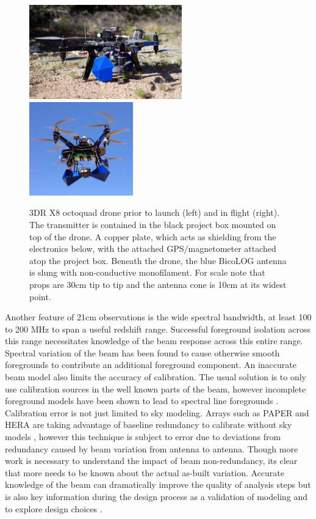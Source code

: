 \documentclass[preprint2,numberedappendix,tighten,twocolappendix]{aastex6}
\begin{document}
\begin{figure}[hbt]
\centering
\includegraphics[width=0.59\textwidth]{figures/drone2.png}
\includegraphics[width=0.4\textwidth]{figures/drone.png}
\caption{3DR X8 octoquad drone prior to launch (left) and in flight (right).  The transmitter is contained in the black project box mounted on top of the drone.  A copper plate, which acts as shielding from the electronics below, with the attached GPS/magnetometer attached atop the project box. Beneath the drone, the blue  BicoLOG antenna is slung with non-conductive monofilament. For scale note that props are 30cm tip to tip and the antenna cone is 10cm at its widest point.}
\label{fig:drone}
\end{figure}
Another feature of 21cm observations is the wide spectral bandwidth, at least 100 to 200 MHz to span a useful redshift range. Successful foreground isolation across this range necessitates knowledge of the beam response across this entire range.  Spectral variation of the beam has been found to cause otherwise smooth foregrounds to contribute an additional foreground component\citep{2016:ThyagarajanBeamChromaticity,2016:EwallWiceHERAdisharXiv}. An inaccurate beam model also limits the accuracy of calibration. The usual solution is to only use calibration sources in the well known parts of the beam, however incomplete foreground models have been shown to lead to spectral line foregrounds \citep{2016:BarryCalibrationRequirements}.  Calibration error is not just limited to sky modeling. Arrays such as PAPER and HERA are taking advantage of baseline redundancy to calibrate without sky models \citep{Liu:2010p10391,Zheng:2014p10467,2015ApJ...809...61A}, however this technique is subject to error due to deviations from redundancy caused by beam variation from antenna to antenna. Though more work is necessary to understand the impact of beam non-redundancy, its clear that more needs to be known about the actual as-built variation.  Accurate knowledge of the beam can dramatically improve the quality of analysis steps but is also key information during the design process as a validation of modeling and to explore design choices \citep{2014IAWPL..13..169V,2016:NebenHERAdish}. 
\end{document}
